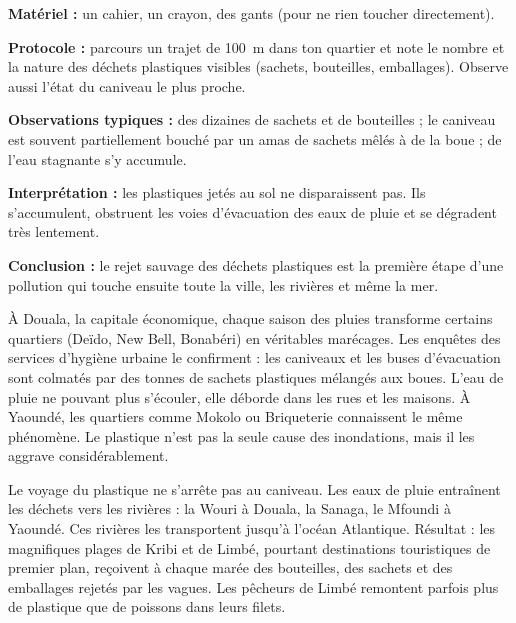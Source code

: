 \documentclass[11pt]{article}
\newcounter{popsec}
\newcounter{popsub}
\newcommand{\courssub}[1]{%
  \stepcounter{popsub}%
  \par\vspace{9pt}\noindent{\popxbold\fontsize{11.5}{13}\selectfont\color{popink}{\color{poporange}\thepopsec.\thepopsub}\hspace{6pt}#1}\par\nopagebreak\vspace{4pt}
}
\begin{document}
\begin{experience}
\textbf{Matériel :} un cahier, un crayon, des gants (pour ne rien toucher directement).

\textbf{Protocole :} parcours un trajet de \SI{100}{m} dans ton quartier et note le nombre et la nature des déchets plastiques visibles (sachets, bouteilles, emballages). Observe aussi l'état du caniveau le plus proche.

\textbf{Observations typiques :} des dizaines de sachets et de bouteilles ; le caniveau est souvent partiellement bouché par un amas de sachets mêlés à de la boue ; de l'eau stagnante s'y accumule.

\textbf{Interprétation :} les plastiques jetés au sol ne disparaissent pas. Ils s'accumulent, obstruent les voies d'évacuation des eaux de pluie et se dégradent très lentement.

\textbf{Conclusion :} le rejet sauvage des déchets plastiques est la première étape d'une pollution qui touche ensuite toute la ville, les rivières et même la mer.
\end{experience}

\begin{exemplebox}
À Douala, la capitale économique, chaque saison des pluies transforme certains quartiers (Deïdo, New Bell, Bonabéri) en véritables marécages. Les enquêtes des services d'hygiène urbaine le confirment : les caniveaux et les buses d'évacuation sont colmatés par des tonnes de sachets plastiques mélangés aux boues. L'eau de pluie ne pouvant plus s'écouler, elle déborde dans les rues et les maisons. À Yaoundé, les quartiers comme Mokolo ou Briqueterie connaissent le même phénomène. Le plastique n'est pas la seule cause des inondations, mais il les aggrave considérablement.
\end{exemplebox}

\courssub{Des rivières et des plages souillées}

Le voyage du plastique ne s'arrête pas au caniveau. Les eaux de pluie entraînent les déchets vers les rivières : la Wouri à Douala, la Sanaga, le Mfoundi à Yaoundé. Ces rivières les transportent jusqu'à l'océan Atlantique. Résultat : les magnifiques plages de Kribi et de Limbé, pourtant destinations touristiques de premier plan, reçoivent à chaque marée des bouteilles, des sachets et des emballages rejetés par les vagues. Les pêcheurs de Limbé remontent parfois plus de plastique que de poissons dans leurs filets.
\end{document}
